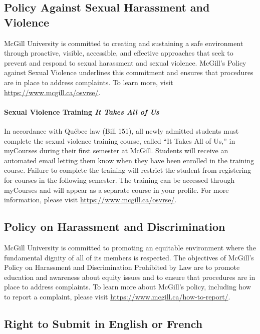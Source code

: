 \documentclass{article}
\begin{document}
\subsection{Policy Against Sexual Harassment and Violence}

McGill University is committed to creating and sustaining a safe
environment through proactive, visible, accessible, and effective
approaches that seek to prevent and respond to sexual harassment and
sexual violence. McGill's Policy against Sexual Violence underlines
this commitment and ensures that procedures are in place to address
complaints. To learn more, visit \url{https://www.mcgill.ca/osvrse/}.

\paragraph{Sexual Violence Training {\em It Takes All of Us}}

In accordance with Québec law (Bill 151), all newly admitted students
must complete the sexual violence training course, called ``It Takes
All of Us,'' in myCourses during their first semester at
McGill. Students will receive an automated email letting them know
when they have been enrolled in the training course. Failure to
complete the training will restrict the student from registering for
courses in the following semester. The training can be accessed
through myCourses and will appear as a separate course in your
profile. For more information, please visit \url{https://www.mcgill.ca/osvrse/}.

\subsection{Policy on Harassment and Discrimination}

McGill University is committed to promoting an equitable environment
where the fundamental dignity of all of its members is respected. The
objectives of McGill's Policy on Harassment and Discrimination
Prohibited by Law are to promote education and awareness about equity
issues and to ensure that procedures are in place to address
complaints. To learn more about McGill's policy, including how to
report a complaint, please visit
\url{https://www.mcgill.ca/how-to-report/}.

\subsection{Right to Submit in English or French}
\end{document}
